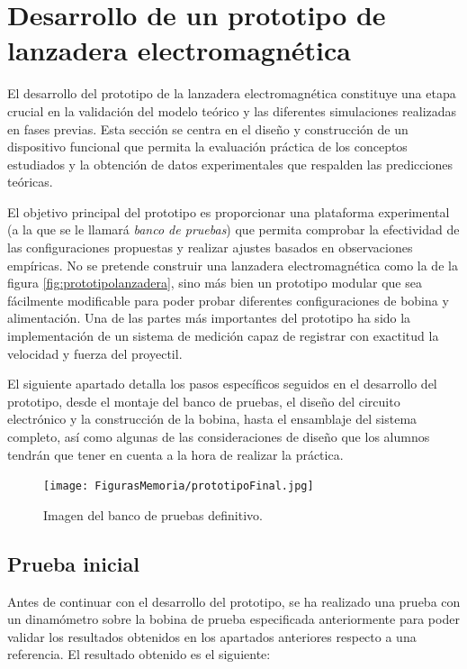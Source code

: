 \section{Desarrollo de un prototipo de lanzadera electromagnética}
\label{sec:prototipo}

El desarrollo del prototipo de la lanzadera electromagnética constituye una etapa crucial en la validación del modelo teórico y las diferentes simulaciones realizadas en fases previas. Esta sección se centra en el diseño y construcción de un dispositivo funcional que permita la evaluación práctica de los conceptos estudiados y la obtención de datos experimentales que respalden las predicciones teóricas.

El objetivo principal del prototipo es proporcionar una plataforma experimental (a la que se le llamará \textit{banco de pruebas}) que permita comprobar la efectividad de las configuraciones propuestas y realizar ajustes basados en observaciones empíricas. No se pretende construir una lanzadera electromagnética como la de la figura \ref{fig:prototipolanzadera}, sino más bien un prototipo modular que sea fácilmente modificable para poder probar diferentes configuraciones de bobina y alimentación. Una de las partes más importantes del prototipo ha sido la implementación de un sistema de medición capaz de registrar con exactitud la velocidad y fuerza del proyectil.

El siguiente apartado detalla los pasos específicos seguidos en el desarrollo del prototipo, desde el montaje del banco de pruebas, el diseño del circuito electrónico y la construcción de la bobina, hasta el ensamblaje del sistema completo, así como algunas de las consideraciones de diseño que los alumnos tendrán que tener en cuenta a la hora de realizar la práctica.

\begin{figure}[H]
    \centering
    \texttt{[image: FigurasMemoria/prototipoFinal.jpg]}
    \caption{Imagen del banco de pruebas definitivo.}
    \label{fig:prototipoFinal} %
\end{figure}

\newpage

\subsection{Prueba inicial}

Antes de continuar con el desarrollo del prototipo, se ha realizado una prueba con un dinamómetro sobre la bobina de prueba especificada anteriormente para poder validar los resultados obtenidos en los apartados anteriores respecto a una referencia. El resultado obtenido es el siguiente:

